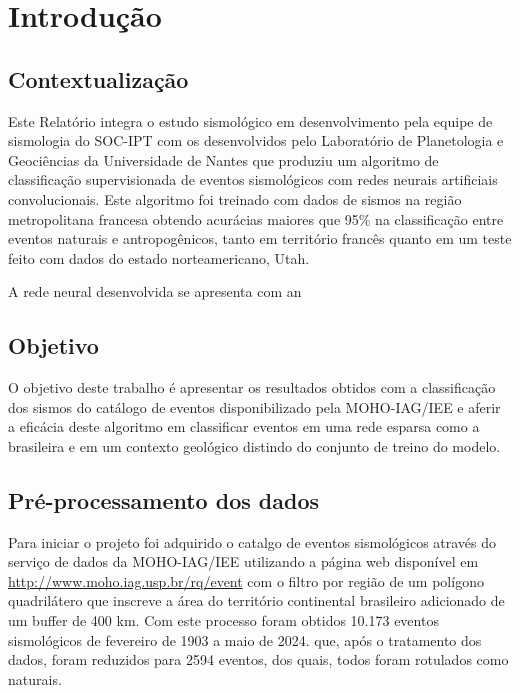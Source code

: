 \section{Introdução}

\subsection{Contextualização}
\par{
    Este Relatório integra o estudo sismológico em desenvolvimento pela equipe de sismologia do SOC-IPT com os desenvolvidos pelo Laboratório de Planetologia e Geociências da Universidade de Nantes que produziu um algoritmo de classificação supervisionada de eventos sismológicos com redes neurais artificiais convolucionais. Este algoritmo foi treinado com dados de sismos na região metropolitana francesa obtendo acurácias maiores que 95\% na classificação entre eventos naturais e antropogênicos, tanto em território francês quanto em um teste feito com dados do estado norteamericano, Utah.

    A rede neural desenvolvida se apresenta com an
}

\subsection{Objetivo}
\par{
    O objetivo deste trabalho é apresentar os resultados obtidos com a classificação dos sismos do catálogo de eventos disponibilizado pela MOHO-IAG/IEE e aferir a eficácia deste algoritmo em classificar eventos em uma rede esparsa como a brasileira e em um contexto geológico distindo do conjunto de treino do modelo.
}

\subsection{Pré-processamento dos dados}

\par{
    Para iniciar o projeto foi adquirido o catalgo de eventos sismológicos através do serviço de dados da MOHO-IAG/IEE utilizando a página web disponível em \url{http://www.moho.iag.usp.br/rq/event} com o filtro por região de um polígono quadrilátero que inscreve a área do território continental brasileiro adicionado de um buffer de 400 km. Com este processo foram obtidos 10.173 eventos sismológicos de fevereiro de 1903 a maio de 2024. que, após o tratamento dos dados, foram reduzidos para 2594 eventos, dos quais, todos foram rotulados como naturais.
}


